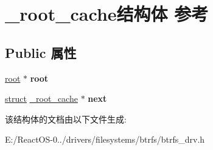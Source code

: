 \hypertarget{struct__root__cache}{}\section{\+\_\+root\+\_\+cache结构体 参考}
\label{struct__root__cache}
\subsection*{Public 属性}
\begin{DoxyCompactItemize}
\item 
\mbox{\label{struct__root__cache_a371377e866c8d4c95d784c569b8d16e1}} 
\hyperlink{struct__root}{root} $\ast$ {\bfseries root}
\item 
\mbox{\label{struct__root__cache_ab0f2f6bc523b2664bd82a4a4aa992658}} 
\hyperlink{interfacestruct}{struct} \hyperlink{struct__root__cache}{\+\_\+root\+\_\+cache} $\ast$ {\bfseries next}
\end{DoxyCompactItemize}


该结构体的文档由以下文件生成\+:\begin{DoxyCompactItemize}
\item 
E\+:/\+React\+O\+S-\/0../drivers/filesystems/btrfs/btrfs\+\_\+drv.\+h\end{DoxyCompactItemize}
